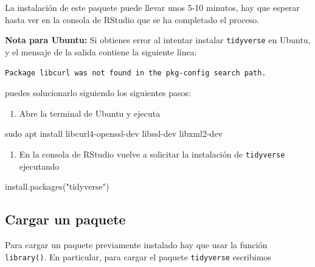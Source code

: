 \documentclass[
  title=normal,
  notoc,
  bib=normal]{mnye}
\newenvironment{Shaded}{\begin{snugshade}}{\end{snugshade}}
\newcommand{\FunctionTok}[1]{\textcolor[rgb]{0.00,0.00,0.00}{#1}}
\newcommand{\NormalTok}[1]{#1}
\newcommand{\StringTok}[1]{\textcolor[rgb]{0.31,0.60,0.02}{#1}}
\providecommand{\tightlist}{%
  \setlength{\itemsep}{0pt}\setlength{\parskip}{0pt}}
\begin{document}
La instalación de este paquete puede llevar unos 5-10 minutos, hay que esperar hasta ver en la consola de \textsf{RStudio} que se ha completado el proceso.

\begin{infobox}

\textbf{Nota para Ubuntu:} Si obtienes error al intentar instalar \texttt{tidyverse} en Ubuntu, y el mensaje de la salida contiene la siguiente línea:

\texttt{Package\ libcurl\ was\ not\ found\ in\ the\ pkg-config\ search\ path.}

puedes solucionarlo siguiendo los siguientes pasos:

\begin{enumerate}
\def\labelenumi{\arabic{enumi}.}
\tightlist
\item
  Abre la terminal de Ubuntu y ejecuta
\end{enumerate}

\begin{Shaded}
\begin{Highlighting}[]
\FunctionTok{sudo}\NormalTok{ apt install libcurl4{-}openssl{-}dev libssl{-}dev libxml2{-}dev}
\end{Highlighting}
\end{Shaded}

\begin{enumerate}
\def\labelenumi{\arabic{enumi}.}
\setcounter{enumi}{1}
\tightlist
\item
  En la consola de \textsf{RStudio} vuelve a solicitar la instalación de \texttt{tidyverse} ejecutando
\end{enumerate}

\begin{Shaded}
\begin{Highlighting}[]
\FunctionTok{install.packages}\NormalTok{(}\StringTok{"tidyverse"}\NormalTok{)}
\end{Highlighting}
\end{Shaded}

\end{infobox}

\hypertarget{cargar-un-paquete}{%
\subsection{Cargar un paquete}\label{cargar-un-paquete}}

Para cargar un paquete previamente instalado hay que usar la función \texttt{library()}. En particular, para cargar el paquete \texttt{tidyverse} escribimos
\end{document}
